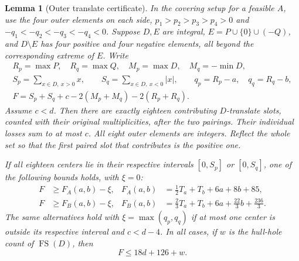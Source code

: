 \documentclass[11pt,a4paper]{article}
\newtheorem{lemma}[theorem]{Lemma}
\theoremstyle{remark}
\newcommand{\FS}{\operatorname{FS}}
\begin{document}
\begin{lemma}[Outer translate certificate]\label{u96:lem:outer-certificate}
In the covering setup for a feasible $A$, use the four outer elements on each side,
$p_1>p_2>p_3>p_4>0$ and $-q_1<-q_2<-q_3<-q_4<0$.
Suppose $D,E$ are integral, $E=P\cup\{0\}\cup(-Q)$, and $D\setminus E$
has four positive and four negative elements, all beyond the corresponding
extreme of $E$. Write
\[
\begin{gathered}
 R_p=\max P,\quad R_q=\max Q,\quad
 M_p=\max D,\quad M_q=-\min D,\\
 S_p=\sum_{x\in D,\ x>0}x,\qquad
 S_q=\sum_{x\in D,\ x<0}|x|,\qquad
 q_p=R_p-a,\quad q_q=R_q-b,\\
 F=S_p+S_q+c-2(M_p+M_q)-2(R_p+R_q).
\end{gathered}
\]
Assume $c<d$. Then there are exactly eighteen contributing $D$-translate
slots, counted with their original multiplicities, after the two pairings.
Their individual losses sum to at most
$c$. All eight outer elements are integers. Reflect the whole set so that
the first paired slot that contributes is the positive one.

If all eighteen centers lie in their respective intervals $[0,S_p]$ or
$[0,S_q]$, one of the following bounds holds, with $\xi=0$:
\begin{align}
 F&\geq F_A(a,b)-\xi,&
 F_A(a,b)&=\tfrac12T_a+T_b+6a+8b+85,\label{u96:eq:FA}\\
 F&\geq F_B(a,b)-\xi,&
 F_B(a,b)&=\tfrac23T_a+T_b+6a+\tfrac{22}3b+\tfrac{236}3.
 \label{u96:eq:FB}
\end{align}
The same alternatives hold with $\xi=\max(q_p,q_q)$ if at most one center
is outside its respective interval and $c<d-4$.
In all cases, if $w$ is the hull-hole count of $\FS(D)$, then
\begin{equation}
 F\leq18d+126+w.\label{u96:eq:F-upper}
\end{equation}
\end{lemma}
\end{document}
